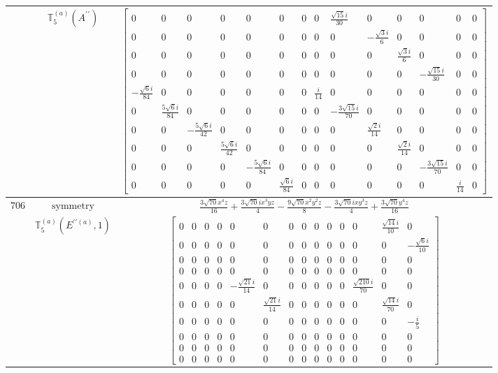 \documentclass[fleqn,8pt,landscape]{jsarticle}
\begin{document}
\begin{longtable}{ccc}
$  $ & $ \mathbb{T}_{5}^{(a)}(A^{\prime\prime}) $ & $ \begin{bmatrix} 0 & 0 & 0 & 0 & 0 & 0 & 0 & 0 & \frac{\sqrt{15} i}{30} & 0 & 0 & 0 & 0 & 0 \\ 0 & 0 & 0 & 0 & 0 & 0 & 0 & 0 & 0 & - \frac{\sqrt{3} i}{6} & 0 & 0 & 0 & 0 \\ 0 & 0 & 0 & 0 & 0 & 0 & 0 & 0 & 0 & 0 & \frac{\sqrt{3} i}{6} & 0 & 0 & 0 \\ 0 & 0 & 0 & 0 & 0 & 0 & 0 & 0 & 0 & 0 & 0 & - \frac{\sqrt{15} i}{30} & 0 & 0 \\ - \frac{\sqrt{6} i}{84} & 0 & 0 & 0 & 0 & 0 & 0 & \frac{i}{14} & 0 & 0 & 0 & 0 & 0 & 0 \\ 0 & \frac{5 \sqrt{6} i}{84} & 0 & 0 & 0 & 0 & 0 & 0 & - \frac{3 \sqrt{15} i}{70} & 0 & 0 & 0 & 0 & 0 \\ 0 & 0 & - \frac{5 \sqrt{6} i}{42} & 0 & 0 & 0 & 0 & 0 & 0 & \frac{\sqrt{2} i}{14} & 0 & 0 & 0 & 0 \\ 0 & 0 & 0 & \frac{5 \sqrt{6} i}{42} & 0 & 0 & 0 & 0 & 0 & 0 & \frac{\sqrt{2} i}{14} & 0 & 0 & 0 \\ 0 & 0 & 0 & 0 & - \frac{5 \sqrt{6} i}{84} & 0 & 0 & 0 & 0 & 0 & 0 & - \frac{3 \sqrt{15} i}{70} & 0 & 0 \\ 0 & 0 & 0 & 0 & 0 & \frac{\sqrt{6} i}{84} & 0 & 0 & 0 & 0 & 0 & 0 & \frac{i}{14} & 0 \end{bmatrix} $ \\ \hline
$ 706 $ & $ \text{symmetry} $ & $ \frac{3 \sqrt{70} x^{4} z}{16} + \frac{3 \sqrt{70} i x^{3} y z}{4} - \frac{9 \sqrt{70} x^{2} y^{2} z}{8} - \frac{3 \sqrt{70} i x y^{3} z}{4} + \frac{3 \sqrt{70} y^{4} z}{16} $ \\
$  $ & $ \mathbb{T}_{5}^{(a)}(E^{\prime\prime(a)},1) $ & $ \begin{bmatrix} 0 & 0 & 0 & 0 & 0 & 0 & 0 & 0 & 0 & 0 & 0 & 0 & \frac{\sqrt{14} i}{10} & 0 \\ 0 & 0 & 0 & 0 & 0 & 0 & 0 & 0 & 0 & 0 & 0 & 0 & 0 & - \frac{\sqrt{6} i}{10} \\ 0 & 0 & 0 & 0 & 0 & 0 & 0 & 0 & 0 & 0 & 0 & 0 & 0 & 0 \\ 0 & 0 & 0 & 0 & 0 & 0 & 0 & 0 & 0 & 0 & 0 & 0 & 0 & 0 \\ 0 & 0 & 0 & 0 & - \frac{\sqrt{21} i}{14} & 0 & 0 & 0 & 0 & 0 & 0 & \frac{\sqrt{210} i}{70} & 0 & 0 \\ 0 & 0 & 0 & 0 & 0 & \frac{\sqrt{21} i}{14} & 0 & 0 & 0 & 0 & 0 & 0 & \frac{\sqrt{14} i}{70} & 0 \\ 0 & 0 & 0 & 0 & 0 & 0 & 0 & 0 & 0 & 0 & 0 & 0 & 0 & - \frac{i}{5} \\ 0 & 0 & 0 & 0 & 0 & 0 & 0 & 0 & 0 & 0 & 0 & 0 & 0 & 0 \\ 0 & 0 & 0 & 0 & 0 & 0 & 0 & 0 & 0 & 0 & 0 & 0 & 0 & 0 \\ 0 & 0 & 0 & 0 & 0 & 0 & 0 & 0 & 0 & 0 & 0 & 0 & 0 & 0 \end{bmatrix} $ \\ \hline

\end{longtable}
\end{document}
